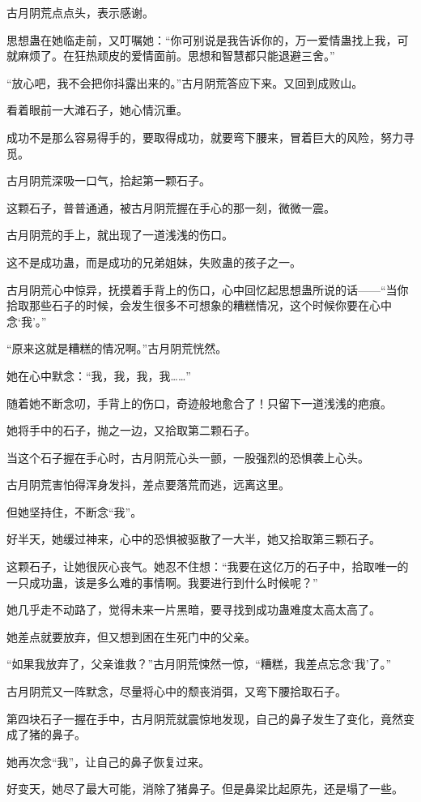 \begin{this_body}
古月阴荒点点头，表示感谢。

思想蛊在她临走前，又叮嘱她：“你可别说是我告诉你的，万一爱情蛊找上我，可就麻烦了。在狂热顽皮的爱情面前。思想和智慧都只能退避三舍。”

“放心吧，我不会把你抖露出来的。”古月阴荒答应下来。又回到成败山。

看着眼前一大滩石子，她心情沉重。

成功不是那么容易得手的，要取得成功，就要弯下腰来，冒着巨大的风险，努力寻觅。

古月阴荒深吸一口气，拾起第一颗石子。

这颗石子，普普通通，被古月阴荒握在手心的那一刻，微微一震。

古月阴荒的手上，就出现了一道浅浅的伤口。

这不是成功蛊，而是成功的兄弟姐妹，失败蛊的孩子之一。

古月阴荒心中惊异，抚摸着手背上的伤口，心中回忆起思想蛊所说的话——“当你拾取那些石子的时候，会发生很多不可想象的糟糕情况，这个时候你要在心中念‘我’。”

“原来这就是糟糕的情况啊。”古月阴荒恍然。

她在心中默念：“我，我，我，我……”

随着她不断念叨，手背上的伤口，奇迹般地愈合了！只留下一道浅浅的疤痕。

她将手中的石子，抛之一边，又拾取第二颗石子。

当这个石子握在手心时，古月阴荒心头一颤，一股强烈的恐惧袭上心头。

古月阴荒害怕得浑身发抖，差点要落荒而逃，远离这里。

但她坚持住，不断念“我”。

好半天，她缓过神来，心中的恐惧被驱散了一大半，她又拾取第三颗石子。

这颗石子，让她很灰心丧气。她忍不住想：“我要在这亿万的石子中，拾取唯一的一只成功蛊，该是多么难的事情啊。我要进行到什么时候呢？”

她几乎走不动路了，觉得未来一片黑暗，要寻找到成功蛊难度太高太高了。

她差点就要放弃，但又想到困在生死门中的父亲。

“如果我放弃了，父亲谁救？”古月阴荒悚然一惊，“糟糕，我差点忘念‘我’了。”

古月阴荒又一阵默念，尽量将心中的颓丧消弭，又弯下腰拾取石子。

第四块石子一握在手中，古月阴荒就震惊地发现，自己的鼻子发生了变化，竟然变成了猪的鼻子。

她再次念“我”，让自己的鼻子恢复过来。

好变天，她尽了最大可能，消除了猪鼻子。但是鼻梁比起原先，还是塌了一些。


\end{this_body}
